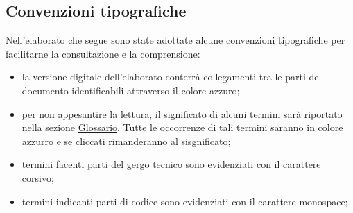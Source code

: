 \subsection*{Convenzioni tipografiche}
Nell’elaborato che segue sono state adottate alcune convenzioni tipografiche per
facilitarne la consultazione e la comprensione:
\begin{itemize}
	\item la versione digitale dell’elaborato conterrà collegamenti tra le parti del documento identificabili attraverso il
	colore azzuro;
	\item per non appesantire la lettura, il significato di alcuni termini sarà riportato nella
	sezione \hyperlink{Glossario}{Glossario}. Tutte le occorrenze di tali termini saranno in colore
	azzurro e se cliccati rimanderanno al sisgnificato;
	\item termini facenti parti del gergo tecnico sono evidenziati con il carattere corsivo;
	\item termini indicanti parti di codice sono evidenziati con il carattere monospace;
\end{itemize}
%
%

\endgroup			

\vfill

